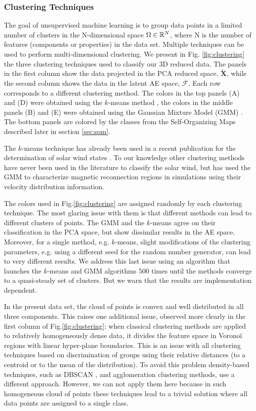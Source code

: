 \subsubsection{Clustering Techniques}
\label{sec:clustering}
The goal of unsupervised machine learning is to group data points in a limited number of clusters in the N-dimensional space $\Omega\in\Bbb R^N$, where N is the number of features (components or properties) in the data set. Multiple techniques can be used to perform multi-dimensional clustering. We present in Fig. \ref{fig:clustering} the three clustering techniques used to classify our 3D reduced data. The panels in the first column show the data projected in the PCA reduced space, $\boldsymbol{\tilde{X}}$, while the second column shows the data in the latent AE space, $\boldsymbol{\mathcal{F}}$. Each row corresponds to a different clustering method. The colors in the top panels (A) and (D) were obtained using the $k$-means method \citep{1056489}, the colors in the middle panels (B) and (E) were obtained using the Gaussian Mixture Model (GMM) \citep{bishop2006machine}. The bottom panels are colored by the classes from the Self-Organizing Maps described later in section \ref{sec:som}.

The $k$-means technique has already been used in a recent publication for the determination of solar wind states \citep{Roberts2020}. To our knowledge other clustering methods have never been used in the literature to classify the solar wind, but \citep{Dupuis2020} has used the GMM to characterize magnetic reconnection regions in simulations using their velocity distribution information.

The colors used in Fig.\ref{fig:clustering} are assigned randomly by each clustering technique. The most glaring issue with them is that different methods can lead to different clusters of points. The GMM and the $k$-means agree on their classification in the PCA space, but show dissimilar results in the AE space. Moreover, for a single method, e.g. $k$-means, slight modifications of the clustering parameters, e.g. using a different seed for the random number generator, can lead to very different results. We address this last issue using an algorithm that launches the $k$-means and GMM algorithms 500 times until the methods converge to a quasi-steady set of clusters. But we warn that the results are implementation dependent.

In the present data set, the cloud of points is convex and well distributed in all three components. This raises one additional issue, observed more clearly in the first column of Fig.\ref{fig:clustering}: when classical clustering methods are applied to relatively homogeneously dense data, it divides the feature space in Vorono\"i regions with linear hyper-plane boundaries. This is an issue with all clustering techniques based on discrimination of groups using their relative distances (to a centroid or to the mean of the distribution). To avoid this problem density-based techniques, such as DBSCAN \citep{ester1996density}, and agglomeration clustering methods, use a different approach. However, we can not apply them here because in such homogeneous cloud of points these techniques lead to a trivial solution where all data points are assigned to a single class.

